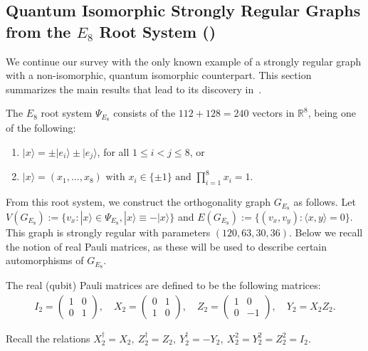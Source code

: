 \subsection{Quantum Isomorphic Strongly Regular Graphs from the $E_8$ Root System (\cite{ALCO_2024__7_2_515_0})}

We continue our survey with the only known example of a
strongly regular graph with a non-isomorphic, quantum isomorphic counterpart.
This section summarizes the main results that lead to its discovery in~\cite{ALCO_2024__7_2_515_0}.
\begin{definition}
    The $E_8$ root system $\Psi_{E_8}$ consists of the $112 + 128 = 240$ vectors in $\mathbb{R}^8$, being one of the following:
    \begin{enumerate}
        \item $|x \rangle = \pm |e_i\rangle \pm |e_j\rangle$, for all $1 \leq i < j \leq 8$, or
        \item $|x\rangle = (x_1, \dots, x_8) \textrm{ with } x_i \in \{\pm1\} \textrm{ and } \prod_{i=1}^8 x_i = 1$.
    \end{enumerate}
\end{definition}
From this root system, we construct the orthogonality graph $G_{E_8}$ as follows.
Let $V(G_{E_8}) := \{v_x:|x\rangle \in \Psi_{E_8}, |x\rangle \equiv -|x\rangle\}$ and $E(G_{E_8}) := \{ (v_x, v_y):\langle x, y\rangle = 0\}$.
This graph is strongly regular with parameters $(120, 63, 30, 36)$.
%
Below we recall the notion of real Pauli matrices, as these will be used 
to describe certain automorphisms of $G_{E_8}$.
\begin{definition}
    The real (qubit) Pauli matrices are defined to be the following matrices:
    \begin{align}
        I_2 = \begin{pmatrix}1 & 0 \\ 0 & 1\end{pmatrix}, \quad
        X_2 = \begin{pmatrix}0 & 1 \\ 1 & 0\end{pmatrix}, \quad
        Z_2 = \begin{pmatrix}1 & 0 \\ 0 & -1\end{pmatrix}, \quad
        Y_2 = X_2 Z_2.
    \end{align}
\end{definition}
Recall the relations $X_2^\dagger = X_2,~Z_2^\dagger = Z_2,~Y_2^\dagger = -Y_2,~X_2^2 = Y_2^2 = Z_2^2 = I_2$.
